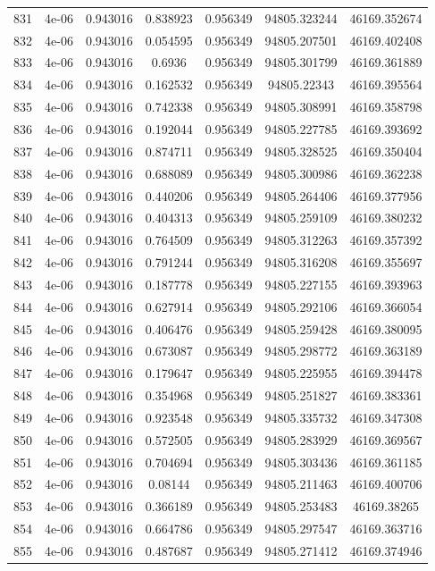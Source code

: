 \begin{table}
\begin{tabular*}{\linewidth}{c|c|c|c|c|c|c}
831 & 4e-06 & 0.943016 & 0.838923 & 0.956349 & 94805.323244 & 46169.352674\\
832 & 4e-06 & 0.943016 & 0.054595 & 0.956349 & 94805.207501 & 46169.402408\\
833 & 4e-06 & 0.943016 & 0.6936 & 0.956349 & 94805.301799 & 46169.361889\\
834 & 4e-06 & 0.943016 & 0.162532 & 0.956349 & 94805.22343 & 46169.395564\\
835 & 4e-06 & 0.943016 & 0.742338 & 0.956349 & 94805.308991 & 46169.358798\\
836 & 4e-06 & 0.943016 & 0.192044 & 0.956349 & 94805.227785 & 46169.393692\\
837 & 4e-06 & 0.943016 & 0.874711 & 0.956349 & 94805.328525 & 46169.350404\\
838 & 4e-06 & 0.943016 & 0.688089 & 0.956349 & 94805.300986 & 46169.362238\\
839 & 4e-06 & 0.943016 & 0.440206 & 0.956349 & 94805.264406 & 46169.377956\\
840 & 4e-06 & 0.943016 & 0.404313 & 0.956349 & 94805.259109 & 46169.380232\\
841 & 4e-06 & 0.943016 & 0.764509 & 0.956349 & 94805.312263 & 46169.357392\\
842 & 4e-06 & 0.943016 & 0.791244 & 0.956349 & 94805.316208 & 46169.355697\\
843 & 4e-06 & 0.943016 & 0.187778 & 0.956349 & 94805.227155 & 46169.393963\\
844 & 4e-06 & 0.943016 & 0.627914 & 0.956349 & 94805.292106 & 46169.366054\\
845 & 4e-06 & 0.943016 & 0.406476 & 0.956349 & 94805.259428 & 46169.380095\\
846 & 4e-06 & 0.943016 & 0.673087 & 0.956349 & 94805.298772 & 46169.363189\\
847 & 4e-06 & 0.943016 & 0.179647 & 0.956349 & 94805.225955 & 46169.394478\\
848 & 4e-06 & 0.943016 & 0.354968 & 0.956349 & 94805.251827 & 46169.383361\\
849 & 4e-06 & 0.943016 & 0.923548 & 0.956349 & 94805.335732 & 46169.347308\\
850 & 4e-06 & 0.943016 & 0.572505 & 0.956349 & 94805.283929 & 46169.369567\\
851 & 4e-06 & 0.943016 & 0.704694 & 0.956349 & 94805.303436 & 46169.361185\\
852 & 4e-06 & 0.943016 & 0.08144 & 0.956349 & 94805.211463 & 46169.400706\\
853 & 4e-06 & 0.943016 & 0.366189 & 0.956349 & 94805.253483 & 46169.38265\\
854 & 4e-06 & 0.943016 & 0.664786 & 0.956349 & 94805.297547 & 46169.363716\\
855 & 4e-06 & 0.943016 & 0.487687 & 0.956349 & 94805.271412 & 46169.374946\\
\end{tabular*}
\end{table}
